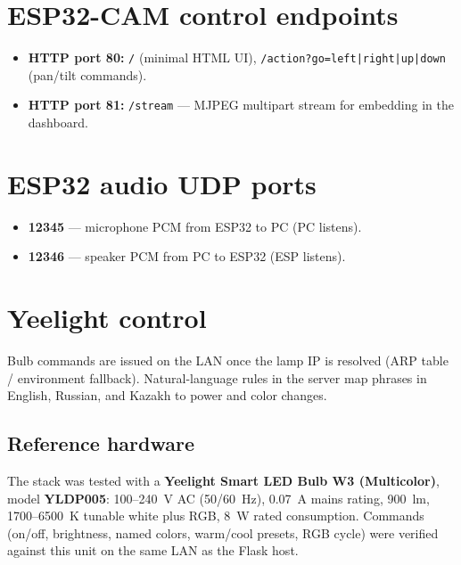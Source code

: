 \documentclass[12pt,a4paper]{report}
\begin{document}
\section{ESP32-CAM control endpoints}

\begin{itemize}
    \item \textbf{HTTP port 80:} \texttt{/} (minimal HTML UI), \texttt{/action?go=left|right|up|down} (pan/tilt commands).
    \item \textbf{HTTP port 81:} \texttt{/stream} --- MJPEG multipart stream for embedding in the dashboard.
\end{itemize}

\section{ESP32 audio UDP ports}

\begin{itemize}
    \item \textbf{12345} --- microphone PCM from ESP32 to PC (PC listens).
    \item \textbf{12346} --- speaker PCM from PC to ESP32 (ESP listens).
\end{itemize}

\section{Yeelight control}

Bulb commands are issued on the LAN once the lamp IP is resolved (ARP table / environment fallback). Natural-language rules in the server map phrases in English, Russian, and Kazakh to power and color changes.

\subsection{Reference hardware}

The stack was tested with a \textbf{Yeelight Smart LED Bulb W3 (Multicolor)}, model \textbf{YLDP005}: 100--240~V AC (50/60~Hz), 0.07~A mains rating, 900~lm, 1700--6500~K tunable white plus RGB, 8~W rated consumption. Commands (on/off, brightness, named colors, warm/cool presets, RGB cycle) were verified against this unit on the same LAN as the Flask host.
\end{document}
